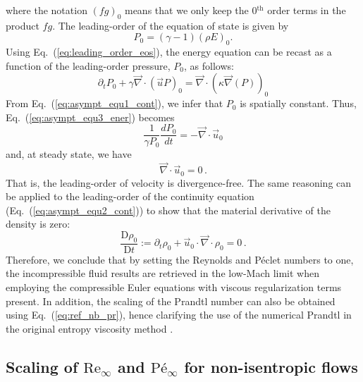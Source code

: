 \documentclass[preprint,10pt]{elsarticle}
\renewcommand{\div}{\vec{\nabla}\! \cdot \!}
\newcommand{\grad}{\vec{\nabla}}
\renewcommand{\Re}{\textrm{Re}}
\newcommand{\Pe}{\textrm{P\'e}}
\newcommand{\matder}[1]{\frac{\textrm{D} #1}{\textrm{D} t}}
\newcommand{\eqt}[1]{Eq.~(\ref{#1})}                     %
\begin{document}
%
where the notation $(fg)_0$ means that we only keep the 0$^{\text{th}}$ order terms in the product $fg$. The leading-order of the equation of state is given by 
\begin{equation}
\label{eq:leading_order_eos}
 P_0 = (\gamma - 1) (\rho E)_0 .
\end{equation}
%
Using \eqt{eq:leading_order_eos}, the energy equation can be recast as a function of the leading-order pressure, $P_0$, as follows:
%
\begin{equation}\label{eq:asympt_equ3_ener}
 \partial_t P_0 + \gamma \div \left( \vec{u} P \right)_0 =  \div(\kappa \grad(P))_0
\end{equation}
%
From \eqt{eq:asympt_equ1_cont}, we infer that $P_0$ is spatially constant. Thus, \eqt{eq:asympt_equ3_ener} becomes
%
\begin{equation}
\frac{1}{\gamma P_0} \frac{d P_0}{dt} = - \div \vec{u}_0 
\end{equation}
%
and, at steady state, we have
%
\begin{equation}
 \div  \vec{u}_0 = 0 \, .
\end{equation}
%
That is, the leading-order of velocity is divergence-free. The same reasoning can be applied to the leading-order of the continuity equation (\eqt{eq:asympt_equ2_cont}) to show that the material derivative of the density is zero:
\begin{equation}
\matder{\rho_0} := \partial_t \rho_0 + \vec{u}_0 \cdot \div \rho_0 = 0 \, .
\end{equation}
%
Therefore, we conclude that by setting the Reynolds and P\'eclet numbers to one, the incompressible fluid results are retrieved in the low-Mach limit when employing the compressible Euler equations with viscous regularization terms present. In addition, the scaling of the Prandtl number can also be obtained using \eqt{eq:ref_nb_pr}, hence clarifying the use of the numerical Prandtl in the original entropy viscosity method \cite{jlg1}.

\subsection{Scaling of $\Re_\infty$ and $\Pe_\infty$ for non-isentropic flows} \label{sec:nonisentropic}
\end{document}
